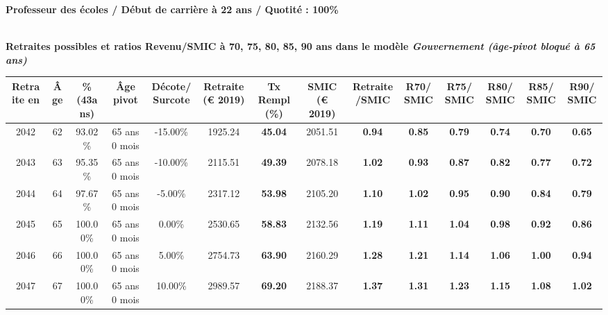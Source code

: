 {\bf \noindent Professeur des écoles / Début de carrière à 22 ans / Quotité : 100\%}  ~ 

 ~\\{\bf \noindent Retraites possibles et ratios Revenu/SMIC à 70, 75, 80, 85, 90 ans dans le modèle \emph{Gouvernement (âge-pivot bloqué à 65 ans)}}  
 
\begin{adjustbox}{max width=\textwidth} 
\begin{tabular}[htb]{|c|c||c|c|c||c|c||c|c||c|c|c|c|c|} 
\hline 
 Retraite en &  Âge &  \%(43ans) &  Âge pivot &  Décote/Surcote &  Retraite (\euro{} 2019) &  Tx Rempl(\%) &  SMIC (\euro{} 2019) &  Retraite/SMIC &  R70/SMIC &  R75/SMIC &  R80/SMIC &  R85/SMIC &  R90/SMIC \\ 
\hline \hline 
 2042 &  62 &  93.02\% &  65 ans 0 mois &  -15.00\% &  1925.24 &  {\bf 45.04} &  2051.51 &  {\bf {\color{red} 0.94}} &  {\bf {\color{red} 0.85}} &  {\bf {\color{red} 0.79}} &  {\bf {\color{red} 0.74}} &  {\bf {\color{red} 0.70}} &  {\bf {\color{red} 0.65}} \\ 
\hline 
 2043 &  63 &  95.35\% &  65 ans 0 mois &  -10.00\% &  2115.51 &  {\bf 49.39} &  2078.18 &  {\bf 1.02} &  {\bf {\color{red} 0.93}} &  {\bf {\color{red} 0.87}} &  {\bf {\color{red} 0.82}} &  {\bf {\color{red} 0.77}} &  {\bf {\color{red} 0.72}} \\ 
\hline 
 2044 &  64 &  97.67\% &  65 ans 0 mois &  -5.00\% &  2317.12 &  {\bf 53.98} &  2105.20 &  {\bf 1.10} &  {\bf 1.02} &  {\bf {\color{red} 0.95}} &  {\bf {\color{red} 0.90}} &  {\bf {\color{red} 0.84}} &  {\bf {\color{red} 0.79}} \\ 
\hline 
 2045 &  65 &  100.00\% &  65 ans 0 mois &  0.00\% &  2530.65 &  {\bf 58.83} &  2132.56 &  {\bf 1.19} &  {\bf 1.11} &  {\bf 1.04} &  {\bf {\color{red} 0.98}} &  {\bf {\color{red} 0.92}} &  {\bf {\color{red} 0.86}} \\ 
\hline 
 2046 &  66 &  100.00\% &  65 ans 0 mois &  5.00\% &  2754.73 &  {\bf 63.90} &  2160.29 &  {\bf 1.28} &  {\bf 1.21} &  {\bf 1.14} &  {\bf 1.06} &  {\bf {\color{red} 1.00}} &  {\bf {\color{red} 0.94}} \\ 
\hline 
 2047 &  67 &  100.00\% &  65 ans 0 mois &  10.00\% &  2989.57 &  {\bf 69.20} &  2188.37 &  {\bf 1.37} &  {\bf 1.31} &  {\bf 1.23} &  {\bf 1.15} &  {\bf 1.08} &  {\bf 1.02} \\ 
\hline 
\hline 
\end{tabular} 
\end{adjustbox} 
 
